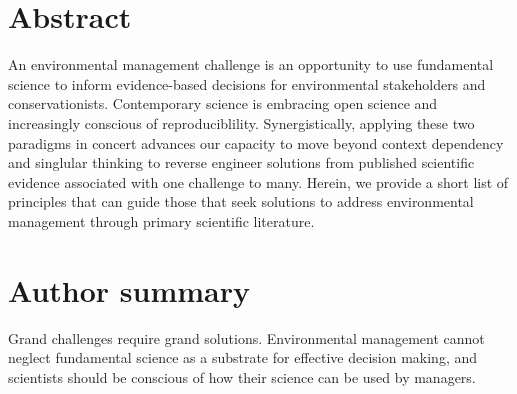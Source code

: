 \documentclass[10pt,letterpaper]{article}
\date{}
\newcommand{\getIndex}[2]{
  \ForEach{,}{\IfEq{#1}{\thislevelitem}{\number\thislevelcount\ExitForEach}{}}{#2}
}
\newcommand{\getAff}[1]{
  \getIndex{#1}{York University}
}
\begin{document}
\vspace*{0.2in}

\section*{Abstract}
An environmental management challenge is an opportunity to use
fundamental science to inform evidence-based decisions for environmental
stakeholders and conservationists. Contemporary science is embracing
open science and increasingly conscious of reproduciblility.
Synergistically, applying these two paradigms in concert advances our
capacity to move beyond context dependency and singlular thinking to
reverse engineer solutions from published scientific evidence associated
with one challenge to many. Herein, we provide a short list of
principles that can guide those that seek solutions to address
environmental management through primary scientific literature.

\section*{Author summary}
Grand challenges require grand solutions. Environmental management
cannot neglect fundamental science as a substrate for effective decision
making, and scientists should be conscious of how their science can be
used by managers.
\end{document}
